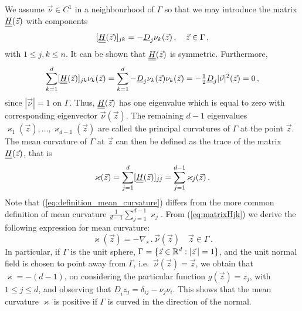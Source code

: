 We assume $\vec \nu \in C^1$ in a neighbourhood of $\Gamma$ so that we
may introduce the matrix $\mat H(\vec z)$ with components
\begin{equation}\label{eq:matrixHjk}
[\mat H (\vec z)]_{jk} = - \underline{D}_j \nu_k (\vec z)\,, \quad \vec z \in
\Gamma \, ,
\end{equation}
with $1\leq j,k\leq n$. It can be shown that $\mat H(\vec z)$ is symmetric.
Furthermore,
\begin{equation}
\sum_{k = 1}^d [\mat H(\vec z)]_{jk} \nu_k (\vec z) =
\sum_{k = 1}^d - \underline{D}_j \nu_k (\vec z) \nu_k (\vec z) =
- \tfrac{1}{2} \underline{D}_j |\vec \nu|^2 (\vec z) = 0 \, ,
\end{equation}
since $|\vec \nu| = 1$ on $\Gamma$. Thus, $\mat H(\vec z)$ has one
eigenvalue which is equal to zero with corresponding eigenvector
$\vec\nu(\vec z)$. The remaining $d - 1$ eigenvalues $\varkappa_1 (\vec z),
\hdots, \varkappa_{d - 1} (\vec z)$ are called the principal curvatures of
$\Gamma$ at the point $\vec z$. The mean curvature of $\Gamma$ at $\vec z$
can then be defined as the trace of the matrix $\mat H(\vec z)$, that is
\begin{equation}\label{eq:definition_mean_curvature}
\varkappa (\vec z) = \sum_{j = 1}^d [\mat H(\vec z)]_{jj} = \sum_{j = 1}^{d -
1} \varkappa_j (\vec z) \,.
\end{equation}
Note that (\ref{eq:definition_mean_curvature}) differs from the more common
definition of mean curvature $\frac{1}{d - 1} \sum_{j = 1}^{d - 1} \varkappa_j$.
From (\ref{eq:matrixHjk}) we derive the following expression for mean
curvature:
\begin{equation}
\varkappa (\vec z)=-\nabla_s \,.\, \vec \nu(\vec z) \quad \vec z \in \Gamma\,.
\end{equation}
In particular, if $\Gamma$ is the unit sphere,
$\Gamma = \{ \vec z \in \mathbb R^d : |\vec z\,| = 1 \}$,
and the unit normal field is chosen to point away from $\Gamma$,
i.e.~$\vec\nu(\vec z) = \vec z$, we obtain that $\varkappa = -
(d - 1)$, on considering the particular function $g(\vec z) = z_j$, with
$1 \leq j \leq d$, and observing that $\underline{D}_i z_j = \delta_{ij} - \nu_j
\nu_i$. This shows that the mean curvature $\varkappa$ is positive if $\Gamma$
is curved in the direction of the normal.

